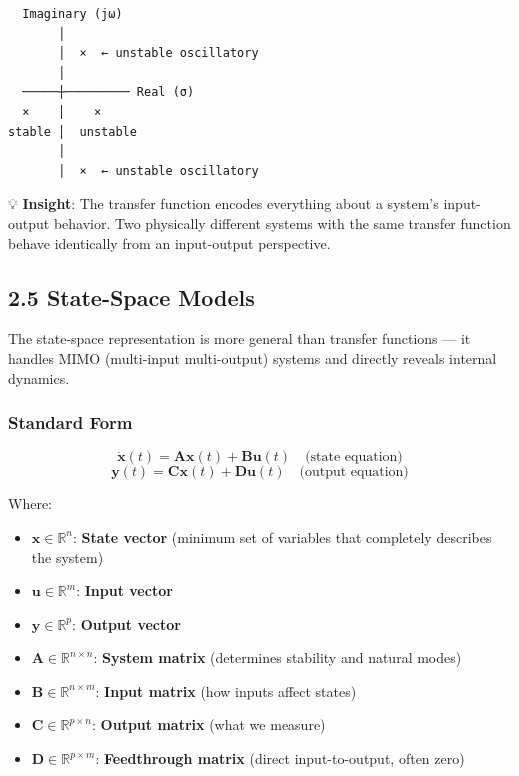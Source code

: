 \documentclass[11pt,a4paper]{book}
\begin{document}
\begin{lstlisting}
  Imaginary (jω)
       │
       │  ×  ← unstable oscillatory
       │    
  ─────┼───────── Real (σ)
  ×    │    ×
stable │  unstable
       │
       │  ×  ← unstable oscillatory
\end{lstlisting}

💡 \textbf{Insight}: The transfer function encodes everything about a system's input-output behavior. Two physically different systems with the same transfer function behave identically from an input-output perspective.

\medskip\noindent\hrulefill\medskip

\subsection{2.5 State-Space Models}

The state-space representation is more general than transfer functions — it handles MIMO (multi-input multi-output) systems and directly reveals internal dynamics.

\subsubsection{Standard Form}

\[\dot{\mathbf{x}}(t) = \mathbf{A}\mathbf{x}(t) + \mathbf{B}\mathbf{u}(t) \quad \text{(state equation)}\]
\[\mathbf{y}(t) = \mathbf{C}\mathbf{x}(t) + \mathbf{D}\mathbf{u}(t) \quad \text{(output equation)}\]

Where:
\begin{itemize}
\item $\mathbf{x} \in \mathbb{R}^n$: \textbf{State vector} (minimum set of variables that completely describes the system)
\item $\mathbf{u} \in \mathbb{R}^m$: \textbf{Input vector}
\item $\mathbf{y} \in \mathbb{R}^p$: \textbf{Output vector}
\item $\mathbf{A} \in \mathbb{R}^{n \times n}$: \textbf{System matrix} (determines stability and natural modes)
\item $\mathbf{B} \in \mathbb{R}^{n \times m}$: \textbf{Input matrix} (how inputs affect states)
\item $\mathbf{C} \in \mathbb{R}^{p \times n}$: \textbf{Output matrix} (what we measure)
\item $\mathbf{D} \in \mathbb{R}^{p \times m}$: \textbf{Feedthrough matrix} (direct input-to-output, often zero)
\end{itemize}
\end{document}
